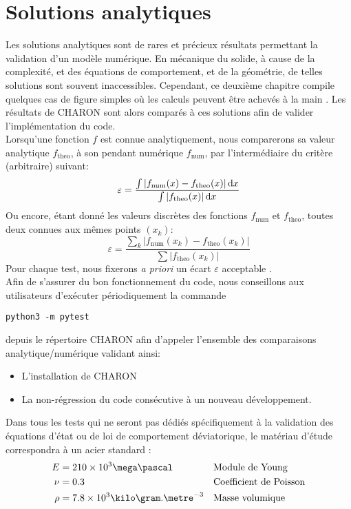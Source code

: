 \documentclass[10pt]{book}
\begin{document}
\chapter{Solutions analytiques}\label{Chapitre:Solutions analytiques}
Les solutions analytiques sont de rares et précieux résultats permettant la validation d'un modèle numérique. En mécanique du solide, à cause de la complexité, et des équations de comportement, et de la géométrie, de telles solutions sont souvent inaccessibles. Cependant, ce deuxième chapitre compile  quelques cas de figure simples où les calculs peuvent être achevés \og à la main \fg{}. Les résultats de CHARON sont alors comparés à ces solutions afin de valider l'implémentation du code.\\

Lorsqu'une fonction $f$ est connue analytiquement, nous comparerons sa valeur analytique $f_{\mathrm{theo}}$, à son pendant numérique $f_{\mathrm{num}}$, par l'intermédiaire du critère (arbitraire) suivant:
$$\varepsilon=\dfrac{\int |f_{\mathrm{num}}(x)-f_{\mathrm{theo}}(x)|\,\mathrm{d}x}{\int |f_{\mathrm{theo}}(x)|\,\mathrm{d}x}$$
Ou encore, étant donné les valeurs discrètes des fonctions $f_{\mathrm{num}}$ et $f_{\mathrm{theo}}$, toutes deux connues aux mêmes points $(x_{k})$:
$$\varepsilon=\dfrac{\sum_{k} |f_{\mathrm{num}}(x_{k})-f_{\mathrm{theo}}(x_{k})|}{\sum|f_{\mathrm{theo}}(x_{k})|}$$
Pour chaque test, nous fixerons \emph{a priori} un écart $\varepsilon$ \og acceptable \fg{}.\\


Afin de s'assurer du bon fonctionnement du code, nous conseillons aux utilisateurs d’exécuter périodiquement la commande
\begin{verbatim}
python3 -m pytest
\end{verbatim}
depuis le répertoire CHARON afin d’appeler l'ensemble des comparaisons analytique/numérique validant ainsi:
\begin{itemize}
\item L'installation de CHARON
\item La non-régression du code consécutive à un nouveau développement.
\end{itemize}
Dans tous les tests qui ne seront pas dédiés spécifiquement à la validation des équations d'état ou de loi de comportement déviatorique, le matériau d'étude correspondra à un acier standard :
\begin{equation}
\begin{aligned}
E &= 210\times 10^{3}\mega\pascal && \text{Module de Young}\\
\nu &= 0.3 && \text{Coefficient de Poisson}\\
\rho &= 7.8\times 10^{3}\kilo\gram.\metre^{-3} && \text{Masse volumique}\\
\end{aligned}
\label{eq:pte_acier_standard}
\end{equation}
\end{document}
